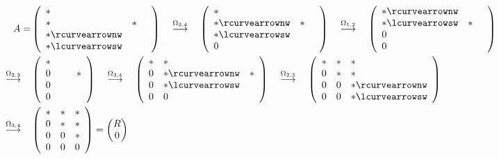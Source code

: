 \begin{align*}
  A= &
       \left(\begin{array}{lcc}
               *~ &&\\
               * &* \\
               * \rcurvearrownw \\ * \lcurvearrowsw
             \end{array}\right)
  \quad \overset{\Omega_{3,4}}{\longrightarrow} \quad
  \left(\begin{array}{lcc}
          *~ &&\\
          * \rcurvearrownw & *\\
          * \lcurvearrowsw \\
          0
        \end{array}\right)
  \quad \overset{\Omega_{1,2}}{\longrightarrow} \quad
  \left(\begin{array}{lcc}
          * \rcurvearrownw\\
          * \lcurvearrowsw & *& \\
          0 \\
          0
        \end{array}\right)\\
  \quad \overset{\Omega_{2,3}}{\longrightarrow} \quad
     &\left(\begin{array}{lcc}
              *~~ \\
              0 && * \\
              0 \\
              0
            \end{array}\right)
  \quad \overset{\Omega_{3,4}}{\longrightarrow} \quad	
  \left(\begin{array}{clc}
          * & *\\
          0 & *  \rcurvearrownw  & * \\
          0 & * \lcurvearrowsw \\
          0 & 0
        \end{array}\right)
              \quad \overset{\Omega_{2,3}}{\longrightarrow} \quad	
              \left(\begin{array}{ccl}
                      * & *  & * \\
                      0 & *  & * \\ 
                      0 & 0 & * \rcurvearrownw\\
                      0 & 0 & *  \lcurvearrowsw 
                    \end{array}\right) \\
  \quad \overset{\Omega_{3,4}}{\longrightarrow} \quad	
     & \left(\begin{array}{ccc}
               * & *  & *  \\
               0 & *  & * \\ 
               0 & 0 & * \\
               0 & 0 & 0
             \end{array}\right)
                       = \begin{pmatrix}
                         R \\ 0 
                       \end{pmatrix}
\end{align*}

